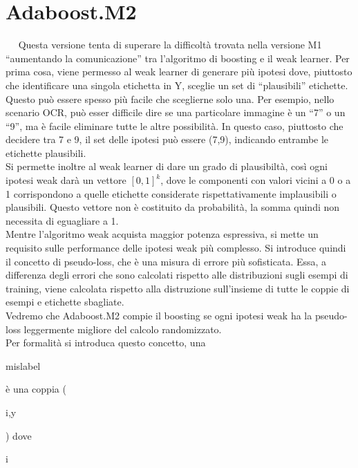 \section{Adaboost.M2}
\ \
\newline
Questa versione tenta di superare la difficolt\`a 
trovata nella versione M1 
``aumentando la comunicazione'' tra l'algoritmo di boosting e il weak learner.
Per prima cosa, viene permesso al weak learner di generare pi\`u ipotesi dove, piuttosto che identificare una singola etichetta 
in Y, sceglie un set di ``plausibili'' etichette. Questo pu\`o essere spesso pi\`u facile che sceglierne solo una.
Per esempio, nello scenario OCR, pu\`o esser difficile dire se una particolare immagine \`e un ``7'' o un ``9'', ma \`e
facile eliminare tutte le altre possibilit\`a. In questo caso, piuttosto che decidere tra 7 e 9, il set delle ipotesi pu\`o
essere (7,9), indicando entrambe le etichette plausibili.\\
\newline
 Si permette inoltre al weak learner di dare un grado di plausibilt\`a, cos\`i ogni ipotesi weak dar\`a
un vettore \begin{math} \left [ 0,1 \right ]^k \end{math}, dove le componenti con valori vicini a 0 o a 1 corrispondono
a quelle etichette considerate rispettativamente implausibili o plausibili. Questo vettore non \`e costituito
da probabilit\`a, la somma quindi non necessita di eguagliare a 1.\\
\newline
Mentre l'algoritmo weak acquista maggior potenza espressiva, si mette un requisito sulle performance delle ipotesi
weak pi\`u complesso. Si introduce quindi il concetto di pseudo-loss, che \`e una misura di errore pi\`u
sofisticata. Essa, a differenza degli errori che sono calcolati 
rispetto alle distribuzioni sugli esempi di training,
viene calcolata rispetto alla distruzione sull'insieme di tutte le coppie di esempi e etichette sbagliate.\\
\newline
Vedremo che Adaboost.M2 compie il boosting se 
ogni ipotesi weak ha la pseudo-loss leggermente migliore del calcolo randomizzato. \\
\newline
Per formalit\`a si introduca questo concetto, una \begin{it}mislabel\end{it}  \`e una coppia (\begin{it}i,y\end{it}) dove \begin{it}i\end{it}
